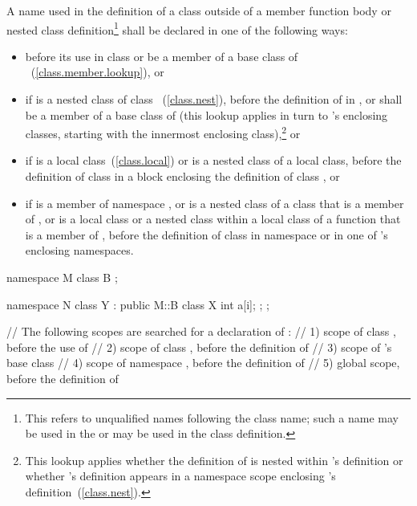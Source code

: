\pnum
A name used in the definition of a class  outside of a member
function body or nested class definition\footnote{This refers to unqualified
names following the class name;
such a name may be used in the  or may be used in
the class definition.}
shall be declared in one of the following ways:

\begin{itemize}
\item before its use in class  or be a member of a base class
of ~(\ref{class.member.lookup}), or
\item if  is a nested class of class
~(\ref{class.nest}), before the definition of  in
, or shall be a member of a base class of  (this
lookup applies in turn to  's enclosing classes, starting with
the innermost enclosing class),\footnote{This lookup applies whether the
definition of  is
nested within 's definition or whether 's definition
appears in a namespace scope enclosing  's
definition~(\ref{class.nest}).}
or
\item if  is a local class~(\ref{class.local}) or is a nested
class of a local class, before the definition of class  in a
block enclosing the definition of class , or
\item if  is a member of namespace , or is a nested
class of a class that is a member of , or is a local class or a
nested class within a local class of a function that is a member of
, before the definition of class  in namespace
 or in one of  's enclosing namespaces.
\end{itemize}

\enterexample 

\begin{codeblock}
namespace M {
	class B { };
}

\end{codeblock}
\begin{codeblock}
namespace N {
	class Y : public M::B {
		class X {
			int a[i];
		};
	};
}

// The following scopes are searched for a declaration of :
// 1) scope of class , before the use of 
// 2) scope of class , before the definition of 
// 3) scope of 's base class 
// 4) scope of namespace , before the definition of 
// 5) global scope, before the definition of 
\end{codeblock}

